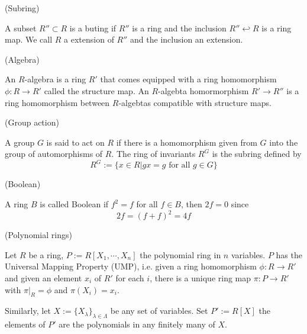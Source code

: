 \documentclass{article}
\begin{document}
\begin{definition}
    (Subring)\par
    A subset $R'' \subset R$ is a buting if $R''$ is a ring and the inclusion $R'' \hookleftarrow R$ is a ring map. We call $R$ a extension of $R''$ and the inclusion an extension.\par
\end{definition}

\begin{definition}
    (Algebra)\par
    An $R$-algebra is a ring $R'$ that comes equipped with a ring homomorphism $\phi:R\to R'$ called the structure map. An $R$-algebta homormorphism $R'\to R''$ is a ring homomorphism between $R$-algebtas compatible with structure maps.\par
\end{definition}

\begin{definition}
    (Group action)\par
    A group $G $ is said to act on $R$ if there is a homomorphism given from $G$ into the group of automorphisms of $R$. The ring of invariants $R^G$ is the subring defined by
    \[R^G := \{x\in R|gx = g\text{ for all }g\in G\}\]
\end{definition}

\begin{definition}
    (Boolean)\par
    A ring $B$ is called Boolean if $f^2 = f$ for all $f\in B$, then $2f = 0$ since
    \[
    2f = (f+f)^2 = 4f
    \]
\end{definition}

\begin{definition}
    (Polynomial rings)\par
    Let $R$ be a ring, $P:=R[X_1,\cdots,X_n]$ the polynomial ring in $n$ variables. $P$ has the Universal Mapping Property (UMP), i.e. given a ring homomorphism $\phi:R\to R'$ and given an element $x_i$ of $R'$ for each $i$, there is a unique ring map $\pi:P\to R'$ with $\pi|_{R} = \phi$ and $\pi(X_i) = x_i$.\par
    Similarly, let $X:= \{X_{\lambda}\}_{\lambda \in \Lambda}$ be any set of variables. Set $P':=R[X]$ the elements of $P'$ are the polynomials in any finitely many of $X$.
\end{definition}
\end{document}
